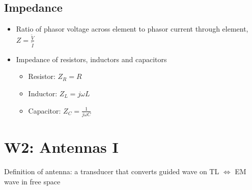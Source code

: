 \documentclass[a4paper]{article}
\begin{document}
\subsection{Impedance}
\begin{itemize}
    \item Ratio of phasor voltage across element to phasor current through element, 
    $Z = \displaystyle\frac{\widetilde{V}}{\widetilde{I}}$
    \item Impedance of resistors, inductors and capacitors
    \begin{itemize}[label=$\circ$]
        \item Resistor: $Z_R = R$
        \item Inductor: $Z_L = j\omega L$
        \item Capacitor: $Z_C = \displaystyle\frac{1}{j\omega C}$
    \end{itemize}
\end{itemize}

\newpage
\section{W2: Antennas I}
Definition of antenna: a transducer that converts guided wave on TL $\Leftrightarrow$ EM wave in free space
\end{document}
